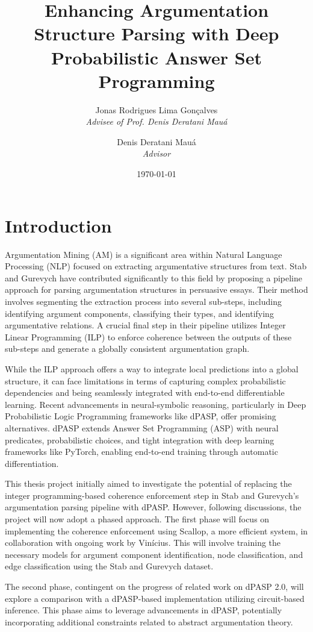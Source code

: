 \documentclass{article}
\title{Enhancing Argumentation Structure Parsing with Deep Probabilistic Answer
Set Programming}
\author{Jonas Rodrigues Lima Gonçalves \\ \textit{Advisee of Prof. Denis
Deratani Mauá} \and Denis Deratani Mauá \\ \textit{Advisor}}
\date{\today}
\begin{document}
\maketitle

\section{Introduction}

Argumentation Mining (AM) is a significant area within Natural Language
Processing (NLP) focused on extracting argumentative structures from text. Stab
and Gurevych have contributed significantly to this field by proposing a
pipeline approach for parsing argumentation structures in persuasive essays.
Their method involves segmenting the extraction process into several sub-steps,
including identifying argument components, classifying their types, and
identifying argumentative relations. A crucial final step in their pipeline
utilizes Integer Linear Programming (ILP) to enforce coherence between the
outputs of these sub-steps and generate a globally consistent argumentation
graph.

While the ILP approach offers a way to integrate local predictions into a global
structure, it can face limitations in terms of capturing complex probabilistic
dependencies and being seamlessly integrated with end-to-end differentiable
learning. Recent advancements in neural-symbolic reasoning, particularly in
Deep Probabilistic Logic Programming frameworks like dPASP, offer promising
alternatives. dPASP extends Answer Set Programming (ASP) with neural
predicates, probabilistic choices, and tight integration with deep learning
frameworks like PyTorch, enabling end-to-end training through automatic
differentiation.

This thesis project initially aimed to investigate the potential of replacing the
integer programming-based coherence enforcement step in Stab and Gurevych's
argumentation parsing pipeline with dPASP. However, following discussions, the
project will now adopt a phased approach. The first phase will focus on
implementing the coherence enforcement using Scallop, a more efficient system,
in collaboration with ongoing work by Vinícius. This will involve training the
necessary models for argument component identification, node classification, and
edge classification using the Stab and Gurevych dataset.

The second phase, contingent on the progress of related work on dPASP 2.0, will
explore a comparison with a dPASP-based implementation utilizing circuit-based
inference. This phase aims to leverage advancements in dPASP, potentially
incorporating additional constraints related to abstract argumentation theory.
\end{document}
